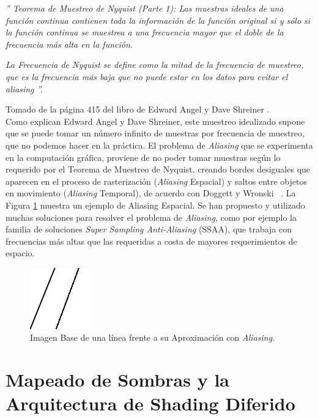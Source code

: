 \documentclass[pregrado]{tesis-usb} %
\begin{document}
\emph{'' Teorema de Muestreo de Nyquist (Parte 1): Las muestras ideales de una función continua contienen toda la información de la función original si y sólo si la función continua se muestrea a una frecuencia mayor que el doble de la frecuencia más alta en la función. }

\emph{La Frecuencia de Nyquist se define como la mitad de la frecuencia de muestreo, que es la frecuencia más baja que no puede estar en los datos para evitar el \textit{aliasing} ''.
} 


Tomado de la página 415 del libro de Edward Angel y Dave Shreiner \cite{Shreiner2011}.  \\

Como explican Edward Angel y Dave Shreiner, este muestreo idealizado supone que se puede tomar un número infinito de muestras por frecuencia de muestreo, que no podemos hacer en la práctica. El problema de \textit{Aliasing} que se experimenta en la computación gráfica, proviene de no poder tomar muestras según lo requerido por el Teorema de Muestreo de Nyquist, creando bordes desiguales que aparecen en el proceso de rasterización (\textit{Aliasing} Espacial) y saltos entre objetos en movimiento (\textit{Aliasing} Temporal), de acuerdo con Doggett y Wronski ~\cite{Doggett2017EDAN35, Wronski2014}. La Figura \ref{fig:aliasingexample} muestra un ejemplo de Aliasing Espacial. Se han propuesto y utilizado muchas soluciones para resolver el problema de \textit{Aliasing}, como por ejemplo la familia de soluciones \textit{Super Sampling Anti-Aliasing} (SSAA), que trabaja con frecuencias más altas que las requeridas a costa de mayores requerimientos de espacio.

\begin{figure}[!hbt]
	\centering
	\includegraphics[scale=0.6]{images/aliasing_example.png} 
	\caption{Imagen Base de una línea frente a su Aproximación con \textit{Aliasing}.}\label{fig:aliasingexample}
\end{figure}

\section[Mapeado de Sombras y la Arquitectura de Shading Diferido]{Mapeado de Sombras y la Arquitectura de Shading Diferido}
\end{document}
